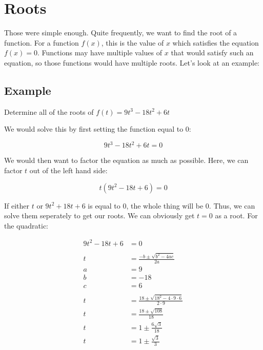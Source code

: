 \documentclass[12pt]{article}
\begin{document}
\section{Roots}
Those were simple enough.
Quite frequently, we want to find the root of a function.
For a function $f(x)$, this is the value of $x$ which satisfies the equation $f(x)=0$.
Functions may have multiple values of $x$ that would satisfy such an equation, so those functions would have multiple roots.
Let's look at an example:

\subsection{Example}
Determine all of the roots of $f(t) = 9t^3 - 18t^2 + 6t$

We would solve this by first setting the function equal to 0:

\begin{equation}
    9t^3 - 18t^2 + 6t = 0
\end{equation}


We would then want to factor the equation as much as possible.
Here, we can factor $t$ out of the left hand side:

\begin{equation}
    t(9t^2 - 18t + 6) = 0
\end{equation}

If either $t$ or $9t^2 + 18t + 6$ is equal to $0$, the whole thing will be $0$.
Thus, we can solve them seperately to get our roots.
We can obviously get $t=0$ as a root.
For the quadratic:

\begin{align}
    9t^2 - 18t + 6 & = 0                                                \\
    \nonumber                                                           \\
    t              & = \frac{-b\pm\sqrt{b^2-4ac}}{2a}                   \\
    a              & = 9                                                \\
    b              & = -18                                              \\
    c              & = 6                                                \\
    \nonumber                                                           \\
    t              & = \frac{18 \pm \sqrt{18^2-4\cdot9\cdot6}}{2\cdot9} \\
    t              & = \frac{18 \pm \sqrt{108}}{18}                     \\
    t              & = 1 \pm \frac{6\sqrt{3}}{18}                       \\
    t              & = 1 \pm \frac{\sqrt{3}}{3}
\end{align}
\end{document}
